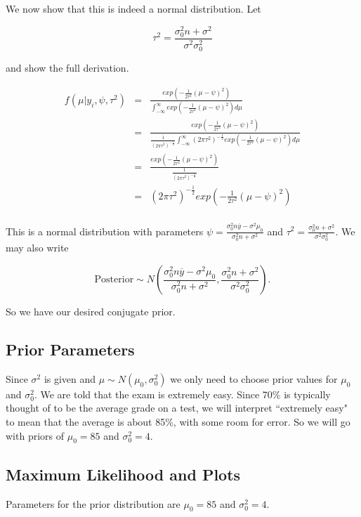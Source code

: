\documentclass[12pt]{article}
\newcommand{\ybar}{\overline{y}}
\begin{document}
\noindent We now show that this is indeed a normal distribution.  Let

\[\tau^2=\frac{\sigma_0^2n+\sigma^2}{\sigma^2\sigma_0^2}\]

\noindent and show the full derivation.

\begin{eqnarray*}
f(\mu|y_i,\psi,\tau^2) &=& \frac{exp(-\frac{1}{2\tau^2}(\mu-\psi)^2)}{\int_{-\infty}^\infty exp(-\frac{1}{2\tau^2}(\mu-\psi)^2)d\mu} \\
&=& \frac{exp(-\frac{1}{2\tau^2}(\mu-\psi)^2)}{\frac{1}{(2\pi\tau^2)^{-\frac{1}{2}}}\int_{-\infty}^\infty(2\pi\tau^2)^{-\frac{1}{2}}exp(-\frac{1}{2\tau^2}(\mu-\psi)^2)d\mu} \\
&=& \frac{exp(-\frac{1}{2\tau^2}(\mu-\psi)^2)}{\frac{1}{(2\pi\tau^2)^{-\frac{1}{2}}}} \\
&=& (2\pi\tau^2)^{-\frac{1}{2}}exp\left(-\frac{1}{2\tau^2}(\mu-\psi)^2\right) \\
\end{eqnarray*}

\noindent This is a normal distribution with parameters $\psi=\frac{\sigma_0^2n\ybar-\sigma^2\mu_0}{\sigma_0^2n+\sigma^2}$ and $\tau^2=\frac{\sigma_0^2n+\sigma^2}{\sigma^2\sigma_0^2}$.  We may also write

\[\mathrm{Posterior}\sim N\left(\frac{\sigma_0^2n\ybar-\sigma^2\mu_0}{\sigma_0^2n+\sigma^2},\frac{\sigma_0^2n+\sigma^2}{\sigma^2\sigma_0^2}\right).\]

\noindent So we have our desired conjugate prior.

\subsection{Prior Parameters}

\noindent Since $\sigma^2$ is given and $\mu\sim N(\mu_0,\sigma_0^2)$ we only need to choose prior values for $\mu_0$ and $\sigma_0^2$.  We are told that the exam is extremely easy.  Since 70\% is typically thought of to be the average grade on a test, we will interpret ``extremely easy" to mean that the average is about 85\%, with some room for error.  So we will go with priors of $\mu_0=85$ and $\sigma_0^2=4$.
\bigskip

\subsection{Maximum Likelihood and Plots}

\noindent Parameters for the prior distribution are $\mu_0=85$ and $\sigma_0^2=4$.
\end{document}
